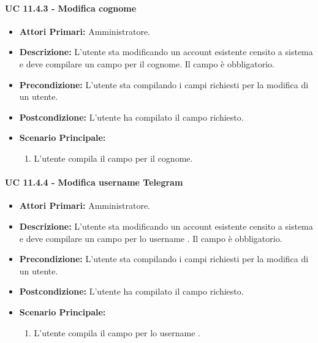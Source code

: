 				\paragraph{UC 11.4.3 - Modifica cognome}
				\begin{itemize}
					\item \textbf{Attori Primari:} Amministratore.
					\item \textbf{Descrizione:} L'utente sta modificando un account esistente censito a sistema e deve compilare un campo per il cognome. Il campo è obbligatorio.
					\item \textbf{Precondizione:} L'utente sta compilando i campi richiesti per la modifica di un utente.
					\item \textbf{Postcondizione:} L'utente ha compilato il campo richiesto.
					\item \textbf{Scenario Principale:}
					\begin{enumerate}
						\item{L'utente compila il campo per il cognome.}
					\end{enumerate}	
				\end{itemize}

				\paragraph{UC 11.4.4 - Modifica username Telegram}
				\begin{itemize}
					\item \textbf{Attori Primari:} Amministratore.
					\item \textbf{Descrizione:} L'utente sta modificando un account esistente censito a sistema e deve compilare un campo per lo username . Il campo è obbligatorio.
					\item \textbf{Precondizione:} L'utente sta compilando i campi richiesti per la modifica di un utente.
					\item \textbf{Postcondizione:} L'utente ha compilato il campo richiesto.
					\item \textbf{Scenario Principale:}
					\begin{enumerate}
						\item{L'utente compila il campo per lo username .}
					\end{enumerate}	
				\end{itemize}

